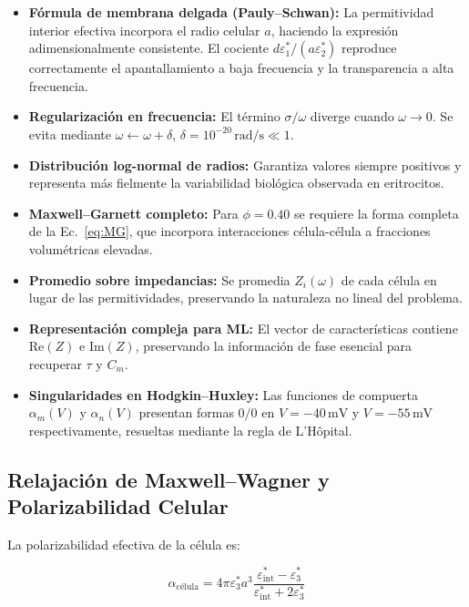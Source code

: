 \documentclass[12pt]{article}
\begin{document}
\begin{itemize}
\item \textbf{F\'ormula de membrana delgada (Pauly--Schwan):}
La permitividad interior efectiva incorpora el radio celular $a$,
haciendo la expresi\'on adimensionalmente consistente. El cociente
$d\varepsilon_1^*/(a\varepsilon_2^*)$ reproduce correctamente el apantallamiento
a baja frecuencia y la transparencia a alta frecuencia.

\item \textbf{Regularizaci\'on en frecuencia:}
El t\'ermino $\sigma/\omega$ diverge cuando $\omega\to 0$. Se evita mediante
$\omega\leftarrow\omega+\delta$, $\delta=10^{-20}\,\text{rad/s}\ll 1$.

\item \textbf{Distribuci\'on log-normal de radios:}
Garantiza valores siempre positivos y representa m\'as fielmente la
variabilidad biol\'ogica observada en eritrocitos.

\item \textbf{Maxwell--Garnett completo:}
Para $\phi=0.40$ se requiere la forma completa de la Ec.~\eqref{eq:MG},
que incorpora interacciones c\'elula-c\'elula a fracciones volum\'etricas elevadas.

\item \textbf{Promedio sobre impedancias:}
Se promedia $Z_i(\omega)$ de cada c\'elula en lugar de las permitividades,
preservando la naturaleza no lineal del problema.

\item \textbf{Representaci\'on compleja para ML:}
El vector de caracter\'isticas contiene $\mathrm{Re}(Z)$ e $\mathrm{Im}(Z)$,
preservando la informaci\'on de fase esencial para recuperar $\tau$ y $C_m$.

\item \textbf{Singularidades en Hodgkin--Huxley:}
Las funciones de compuerta $\alpha_m(V)$ y $\alpha_n(V)$ presentan formas
$0/0$ en $V=-40\,\text{mV}$ y $V=-55\,\text{mV}$ respectivamente, resueltas
mediante la regla de L'H\^opital.
\end{itemize}

\subsection{Relajaci\'on de Maxwell--Wagner y Polarizabilidad Celular}

La polarizabilidad efectiva de la c\'elula es:

\begin{equation}
\alpha_{\text{c\'elula}} =
4\pi\varepsilon_3^* a^3
\frac{\varepsilon_{\text{int}}^* - \varepsilon_3^*}
{\varepsilon_{\text{int}}^* + 2\varepsilon_3^*}
\end{equation}
\end{document}
